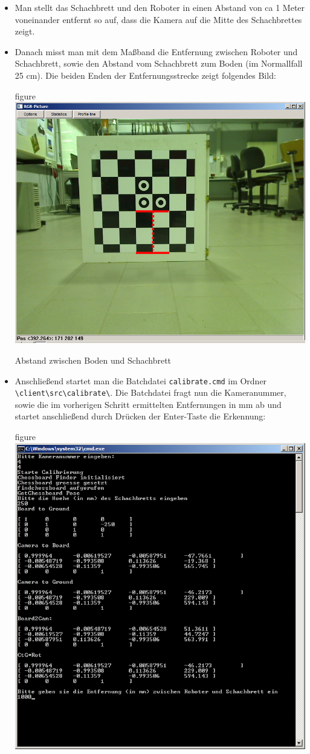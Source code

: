 \begin{itemize}
\item Man stellt das Schachbrett und den Roboter in einen Abstand von
  ca 1 Meter voneinander entfernt so auf, dass die Kamera auf die
  Mitte des Schachbrettes zeigt. 
\item Danach misst man mit dem Maßband die Entfernung zwischen Roboter
  und Schachbrett, sowie den Abstand vom Schachbrett zum Boden (im
  Normallfall 25 cm). Die
  beiden Enden der Entfernungs\-strecke zeigt folgendes Bild:
 \begin{nofloat}{figure}\centering
    \includegraphics[width=0.55\linewidth]{bilder/camToGround_red}
    \caption{Abstand zwischen Boden und Schachbrett}
  \end{nofloat}
\item Anschließend startet man die Batchdatei \verb|calibrate.cmd| im
  Ordner \verb|\client\src\calibrate\|. Die Batchdatei fragt nun die
  Kameranummer, sowie die im vorherigen Schritt ermittelten 
 Entfernungen in mm ab und startet anschließend durch Drücken der
 Enter-Taste die Erkennung:
 \begin{nofloat}{figure}\centering
    \includegraphics[width=1\linewidth]{bilder/calibrate1}

\end{nofloat}
\end{itemize}
